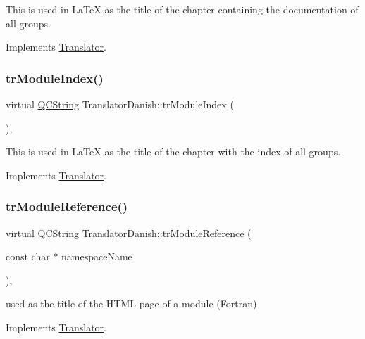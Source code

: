 This is used in La\+TeX as the title of the chapter containing the documentation of all groups. 

Implements \mbox{\hyperlink{class_translator}{Translator}}.

\mbox{\label{class_translator_danish_ad2088e7a730483bdcf4fa0f88be4e730}} 
\subsubsection{\texorpdfstring{trModuleIndex()}{trModuleIndex()}}
{\footnotesize\ttfamily virtual \mbox{\hyperlink{class_q_c_string}{Q\+C\+String}} Translator\+Danish\+::tr\+Module\+Index (\begin{DoxyParamCaption}{ }\end{DoxyParamCaption})\hspace{0.3cm}{\ttfamily [inline]}, {\ttfamily [virtual]}}

This is used in La\+TeX as the title of the chapter with the index of all groups. 

Implements \mbox{\hyperlink{class_translator}{Translator}}.

\mbox{\label{class_translator_danish_a8f089a8b6af0a93491cb91a55b4d61e9}} 
\subsubsection{\texorpdfstring{trModuleReference()}{trModuleReference()}}
{\footnotesize\ttfamily virtual \mbox{\hyperlink{class_q_c_string}{Q\+C\+String}} Translator\+Danish\+::tr\+Module\+Reference (\begin{DoxyParamCaption}\item[{const char $\ast$}]{namespace\+Name }\end{DoxyParamCaption})\hspace{0.3cm}{\ttfamily [inline]}, {\ttfamily [virtual]}}

used as the title of the H\+T\+ML page of a module (Fortran) 

Implements \mbox{\hyperlink{class_translator}{Translator}}.

